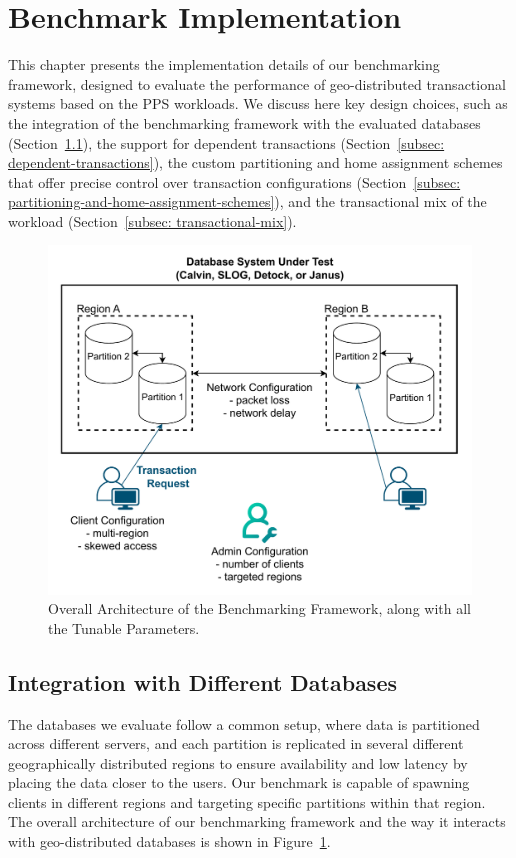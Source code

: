 \section{Benchmark Implementation}
\label{sec: benchmark-implementation}
This chapter presents the implementation details of our benchmarking framework, designed to evaluate the performance of geo-distributed transactional systems based on the PPS workloads. We discuss here key design choices, such as the integration of the benchmarking framework with the evaluated databases (Section~\ref{subsec: integration-with-different-databases}), the support for dependent transactions (Section~\ref{subsec: dependent-transactions}), the custom partitioning and home assignment schemes that offer precise control over transaction configurations (Section~\ref{subsec: partitioning-and-home-assignment-schemes}), and the transactional mix of the workload (Section~\ref{subsec: transactional-mix}).

\begin{figure}[ht]
    \centering
    \includegraphics[width=1\linewidth]{figures/Overall Architecture.pdf}
    \caption{Overall Architecture of the Benchmarking Framework, along with all the Tunable Parameters.}
    \label{fig: overall-architecture}
\end{figure}

\subsection{Integration with Different Databases}
\label{subsec: integration-with-different-databases}
The databases we evaluate follow a common setup, where data is partitioned across different servers, and each partition is replicated in several different geographically distributed regions to ensure availability and low latency by placing the data closer to the users. Our benchmark is capable of spawning clients in different regions and targeting specific partitions within that region. The overall architecture of our benchmarking framework and the way it interacts with geo-distributed databases is shown in Figure~\ref{fig: overall-architecture}.

